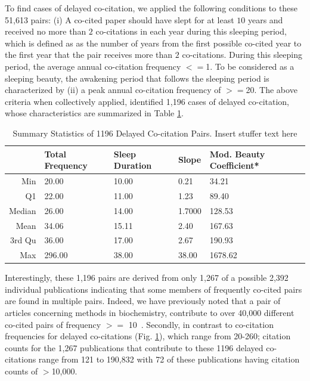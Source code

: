 \documentclass[utf8]{frontiersSCNS}
\newcommand\Tstrut{\rule{0pt}{2.9ex}} %
\begin{document}
To find cases of delayed co-citation, we applied the following conditions to these 51,613 pairs: (i)  A co-cited paper should have slept for at least $10$ years and received no more than $2$ co-citations in each year during this sleeping period, which is defined as as the number of years from the first possible co-cited year to the first year that the pair receives more than $2$ co-citations. During this sleeping period, the average annual co-citation frequency $<=$1.  To be considered as a sleeping beauty, the awakening period that follows the sleeping period is characterized by (ii) a peak annual co-citation frequency of $>=$20. The above criteria when collectively applied, identified 1,196 cases of delayed co-citation, whose characteristics are summarized in Table \ref{tab:table2}. 

\begin{table}[ht]
\caption{Summary Statistics of 1196 Delayed Co-citation Pairs. Insert stuffer text here}%
\centering %
\begin{center}
\begin{tabular}{rllll} 
& Total Frequency & Sleep Duration & Slope & Mod. Beauty Coefficient* \\
\hline %
Min &  20.00 & 10.00 & 0.21 & 34.21   \Tstrut\\ 
Q1  &  22.00 & 11.00  & 1.23 & 89.40   \\ 
Median & 26.00 & 14.00 & 1.7000 & 128.53   \\ 
Mean & 34.06 & 15.11 & 2.40 & 167.63   \\ 
3rd Qu & 36.00 & 17.00 & 2.67 & 190.93   \\ 
Max & 296.00 & 38.00  & 38.00  & 1678.62   \\ 
\hline
\end{tabular}
\end{center}
\label{tab:table2} %
\end{table}

Interestingly, these 1,196 pairs are derived from only 1,267 of a possible 2,392 individual publications indicating that some members of frequently co-cited pairs are found in multiple pairs. Indeed, we have previously noted that a pair of articles concerning methods in biochemistry, contribute to over 40,000 different co-cited pairs of frequency $>=$ 10~\citep{devarakonda_2020}.  Secondly, in contrast to co-citation frequencies for delayed co-citations (Fig. \ref{tab:table2}), which range from 20-260; citation counts for the 1,267 publications that contribute to these 1196 delayed co-citations range from 121 to 190,832 with 72 of these publications having citation counts of $>$10,000. 
\end{document}
